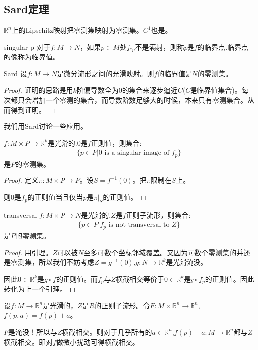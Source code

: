 \documentclass{package/fancy-book}
\newcommand{\R}{\mathbb{R}}
\begin{document}
\subsection{Sard定理}
\begin{lemma}{}
    $\R^n$上的Lipschitz映射把零测集映射为零测集。$C^1$也是。
\end{lemma}
\begin{definition}{singular-p}
    对于$f:M \to N$，如果$p \in M$处$f_{*p}$不是满射，则称$p$是$f$的临界点.临界点的像称为临界值。
\end{definition}
\begin{theorem}[Sard定理]{Sard}
    设$f:M \to N$是微分流形之间的光滑映射。则$f$的临界值是$N$的零测集。
\end{theorem}
\begin{proof}
    证明的思路是用$k$阶偏导数全为$0$的集合来逐步逼近$C$($C$是临界值集合)。每次都只会增加一个零测的集合，而导数阶数足够大的时候，本来只有零测集合。从而得到证明。
\end{proof}
我们用Sard讨论一些应用。
\begin{lemma}{}
    $f:M \times P \to \R^k$是光滑的.$0$是$f$正则值，则集合:
    \begin{align}
        \{p \in P|0\text{ is a singular image of }f_p\}
    \end{align}
    是$P$的零测集。
\end{lemma}
\begin{proof}
    定义$\pi:M \times P \to P$。设$S=f^{-1}(0)$。把$\pi$限制在$S$上。
    
    则$0$是$f_p$的正则值当且仅当$p$是$\pi|_S$的正则值。
\end{proof}
\begin{theorem}[横截性定理]{transversal}
    $f:M \times P \to N$是光滑的.$Z$是$f$正则子流形，则集合:
    \begin{align}
        \{p \in P|f_p \text{ is not transversal to 
         }Z\}
    \end{align}
    是$P$的零测集。
\end{theorem}
\begin{proof}
    用引理。$Z$可以被$N$至多可数个坐标邻域覆盖。又因为可数个零测集的并还是零测集，所以我们不妨考虑$Z=g^{-1}(0)$,$g:N \to \R^k$是光滑淹没。

    因此$0 \in \R^k$是$g \circ f$的正则值。而$f_p$与$Z$横截相交等价于$0 \in \R^k$是$g \circ f_p$的正则值。因此转化为上一个引理。
\end{proof}
\begin{example}[映射的微扰]{}
    设$f:M \to \R^n$是光滑的，$Z$是$R$的正则子流形。令$F: M \times \R^n \to \R^n$,$f(p,a)=f(p)+a$。

    $F$是淹没！所以与$Z$横截相交。则对于几乎所有的$a \in \R^n$,$f(p)+a:M \to \R^n$都与$Z$横截相交。即对$f$做微小扰动可得横截相交。
\end{example}
\end{document}
